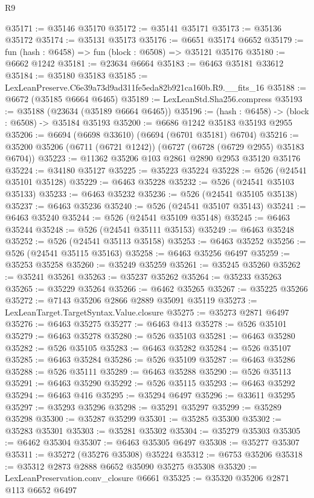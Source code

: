 \begin{lexlean}{R9}
\begin{coremodule}
@35171 := @35146 @35170
@35172 := @35141 @35171
@35173 := @35136 @35172
@35174 := @35131 @35173
@35176 := @6651 @35174 @6652
@35179 := fun (hash : @6458) => fun (block : @6508) => @35121 @35176
@35180 := @6662 @1242
@35181 := @23634 @6664
@35183 := @6463 @35181 @33612
@35184 := @35180 @35183
@35185 := LexLeanPreserve.C6e39a73d9ad311fe5eda82b921ca160b.R9.__fits_16
@35188 := @6672 (@35185 @6664 @6465)
@35189 := LexLeanStd.Sha256.compress
@35193 := @35188 (@23634 (@35189 @6664 @6465))
@35196 := (hash : @6458) -> (block : @6508) -> @35184 @35193
@35200 := @6686 @1242 @35183 @35193 @2955
@35206 := @6694 (@6698 @33610) (@6694 (@6701 @35181) @6704)
@35216 := @35200 @35206 (@6711 (@6721 @1242)) (@6727 (@6728 (@6729 @2955) @35183 @6704))
@35223 := @11362 @35206 @103 @2861 @2890 @2953 @35120 @35176
@35224 := @34180 @35127
@35225 := @35223 @35224
@35228 := @526 (@24541 @35101 @35128)
@35229 := @6463 @35228
@35232 := @526 (@24541 @35103 @35133)
@35233 := @6463 @35232
@35236 := @526 (@24541 @35105 @35138)
@35237 := @6463 @35236
@35240 := @526 (@24541 @35107 @35143)
@35241 := @6463 @35240
@35244 := @526 (@24541 @35109 @35148)
@35245 := @6463 @35244
@35248 := @526 (@24541 @35111 @35153)
@35249 := @6463 @35248
@35252 := @526 (@24541 @35113 @35158)
@35253 := @6463 @35252
@35256 := @526 (@24541 @35115 @35163)
@35258 := @6463 @35256 @6497
@35259 := @35253 @35258
@35260 := @35249 @35259
@35261 := @35245 @35260
@35262 := @35241 @35261
@35263 := @35237 @35262
@35264 := @35233 @35263
@35265 := @35229 @35264
@35266 := @6462 @35265
@35267 := @35225 @35266
@35272 := @7143 @35206 @2866 @2889 @35091 @35119
@35273 := LexLeanTarget.TargetSyntax.Value.closure
@35275 := @35273 @2871 @6497
@35276 := @6463 @35275
@35277 := @6463 @413
@35278 := @526 @35101
@35279 := @6463 @35278
@35280 := @526 @35103
@35281 := @6463 @35280
@35282 := @526 @35105
@35283 := @6463 @35282
@35284 := @526 @35107
@35285 := @6463 @35284
@35286 := @526 @35109
@35287 := @6463 @35286
@35288 := @526 @35111
@35289 := @6463 @35288
@35290 := @526 @35113
@35291 := @6463 @35290
@35292 := @526 @35115
@35293 := @6463 @35292
@35294 := @6463 @416
@35295 := @35294 @6497
@35296 := @33611 @35295
@35297 := @35293 @35296
@35298 := @35291 @35297
@35299 := @35289 @35298
@35300 := @35287 @35299
@35301 := @35285 @35300
@35302 := @35283 @35301
@35303 := @35281 @35302
@35304 := @35279 @35303
@35305 := @6462 @35304
@35307 := @6463 @35305 @6497
@35308 := @35277 @35307
@35311 := @35272 (@35276 @35308) @35224
@35312 := @6753 @35206
@35318 := @35312 @2873 @2888 @6652 @35090 @35275 @35308
@35320 := LexLeanPreservation.conv_closure @6661
@35325 := @35320 @35206 @2871 @113 @6652 @6497

\end{coremodule}
\end{lexlean}
